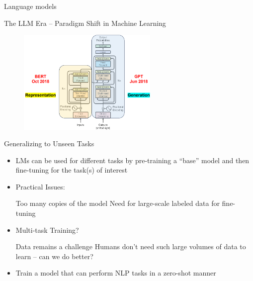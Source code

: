 \documentclass[serif, aspectratio=169]{beamer}
\begin{document}
\begin{frame}{Language models}
    \begin{exampleblock}{The LLM Era – Paradigm Shift in Machine Learning}
        \hspace{2.8cm}
        \begin{figure}
        \centering
        \includegraphics[width=0.6\textwidth]{pic/llm.png}
        \caption{}
        \end{figure}
    \end{exampleblock}
\end{frame}

\begin{frame}{Generalizing to Unseen Tasks}
    \vspace{0.5cm}
    \begin{itemize}
        \item
            \large{LMs can be used for different tasks by pre-training a “base” model and then fine-tuning for the task(s) of interest}
            \vspace{0.3cm}
        \item 
            \large{Practical Issues:}
            \vspace{0.1cm}
            \begin{outline}
                \1 Too many copies of the model
                \1 Need for large-scale labeled data for fine-tuning
            \end{outline}
        \item 
            \large{Multi-task Training?}
            \vspace{0.1cm}
            \begin{outline}
                \1 Data remains a challenge 
                \1  Humans don’t need such large volumes of data to learn – can we do better?
            \end{outline}
        \item 
            \large{Train a model that can perform NLP tasks in a zero-shot manner}
    \end{itemize}
\end{frame}
\end{document}
